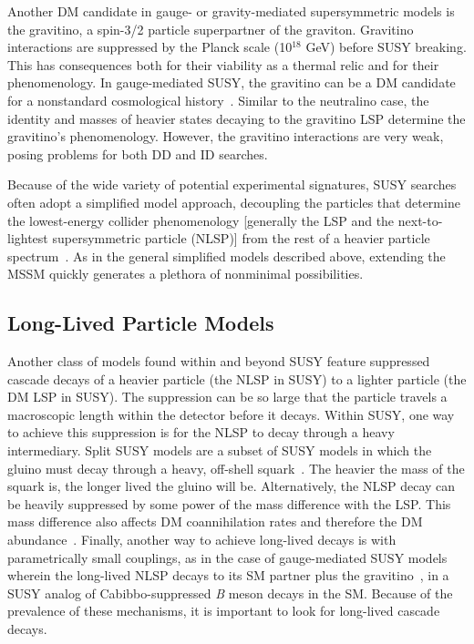 \documentclass{ar-1col}
\begin{document}
Another DM candidate in gauge- or gravity-mediated supersymmetric
models is the gravitino, a spin-3/2 particle superpartner of the
graviton. Gravitino interactions are suppressed by the Planck
scale (10$^{18}$ GeV) before SUSY breaking. This has consequences
both for their viability as a thermal relic and for their
phenomenology. In gauge-mediated SUSY, the gravitino can be a DM
candidate for a nonstandard cosmological
history~\cite{Dimopoulos:1996vz}. Similar to the neutralino case,
the identity and masses of heavier states decaying to the
gravitino LSP determine the gravitino's phenomenology. However, the gravitino
interactions are very weak, posing problems for both DD and
ID searches.

Because of the wide variety of potential experimental signatures,
SUSY searches often adopt a simplified model approach,
decoupling the particles that determine the lowest-energy collider
phenomenology [generally the LSP and the next-to-lightest supersymmetric particle (NLSP)] from the rest of a heavier
particle spectrum~\cite{Alves:2011wf}. 
As in the general simplified models described above, extending the MSSM quickly
generates a plethora of nonminimal possibilities.

\subsection{Long-Lived Particle Models}\label{sec:LLPModels}

Another class of models found within and beyond SUSY feature suppressed cascade decays of a heavier particle (the NLSP
in SUSY) to a lighter particle (the DM LSP in SUSY). The
suppression can be so large that the particle travels a
macroscopic length within the detector before it decays. Within
SUSY, one way to achieve this suppression is for the NLSP to decay
through a heavy intermediary. Split SUSY models are a
subset of SUSY models in which the gluino must decay through a heavy,
off-shell squark~\cite{Masiero:2004ft}. The heavier the mass of
the squark is, the longer lived the gluino will be. Alternatively, the NLSP
decay can be heavily suppressed by some power of the mass
difference with the LSP. This mass difference also affects DM
coannihilation rates and therefore the DM
abundance~\cite{Ellis:1999mm}. Finally, another way to achieve
long-lived decays is with parametrically small couplings, as in
the case of gauge-mediated SUSY models wherein the
long-lived NLSP decays to its SM partner plus the
gravitino~\cite{Dimopoulos:1996vz}, in a SUSY analog of Cabibbo-suppressed \textit{B} meson decays in the SM. Because of the prevalence of
these mechanisms, it is important to look for long-lived cascade
decays.
\end{document}
